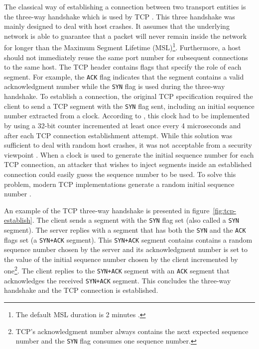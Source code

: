 
The classical way of establishing a connection between two transport
entities is the three-way handshake which is used by TCP
\cite{rfc793}. This three handshake was mainly designed to deal with host crashes. It assumes that the underlying network is able to guarantee that a packet will never remain inside the network for longer than the Maximum Segment Lifetime (MSL)\footnote{The default MSL duration is 2 minutes \cite{rfc793}.}. Furthermore, a host should not immediately reuse the same port number for subsequent connections to the same host. 
The TCP header contains flags that specify the role of
each segment. For example, the \texttt{ACK} flag indicates that the
segment contains a valid acknowledgment number while the \texttt{SYN}
flag is used during the three-way handshake. To establish a
connection, the original TCP specification \cite{rfc793} required the
client to send a TCP segment with the \texttt{SYN} flag sent, including an
initial sequence number extracted from a clock. According to \cite{rfc793},
this clock had to be implemented by using a 32-bit counter 
incremented at least once every 4 microseconds and after each TCP
connection establishment attempt. While this solution was sufficient
to deal with random host crashes, it was not acceptable from a
security viewpoint \cite{rfc6528}. When a clock is used to generate the initial
sequence number for each TCP connection, an attacker that wishes to
inject segments inside an established connection could easily guess
the sequence number to be used. To solve this problem, modern TCP
implementations generate a random initial sequence number
\cite{rfc6528}.

An example of the TCP three-way handshake is presented in figure~\ref{fig:tcp-establish}. The client sends a segment with the \texttt{SYN} flag set (also called a \texttt{SYN} segment). The server replies with a segment that has both the \texttt{SYN} and the \texttt{ACK} flags set (a \texttt{SYN+ACK} segment). This \texttt{SYN+ACK} segment contains contains a random sequence number chosen by the server and its acknowledgment number is set to the value of the initial sequence number chosen by the client incremented by one\footnote{TCP's acknowledgment number always contains the next expected sequence number and the \texttt{SYN} flag consumes one sequence number.}. The client replies to the \texttt{SYN+ACK} segment with an \texttt{ACK} segment that acknowledges the received \texttt{SYN+ACK} segment. This concludes the three-way handshake and the TCP connection is established.

